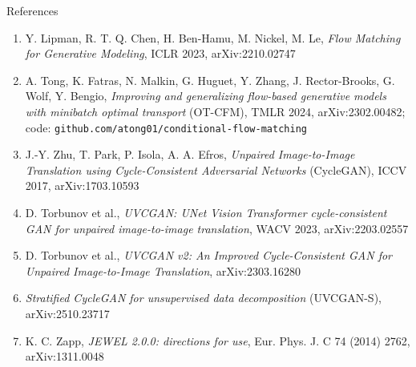 \documentclass[aspectratio=169,10pt]{beamer}
\begin{document}
\begin{frame}{References}
\footnotesize
\begin{enumerate}\setlength\itemsep{0.4em}
\item Y. Lipman, R. T. Q. Chen, H. Ben-Hamu, M. Nickel, M. Le, \emph{Flow Matching for Generative
  Modeling}, ICLR 2023, arXiv:2210.02747
\item A. Tong, K. Fatras, N. Malkin, G. Huguet, Y. Zhang, J. Rector-Brooks, G. Wolf, Y. Bengio,
  \emph{Improving and generalizing flow-based generative models with minibatch optimal transport}
  (OT-CFM), TMLR 2024, arXiv:2302.00482; code: \texttt{github.com/atong01/conditional-flow-matching}
\item J.-Y. Zhu, T. Park, P. Isola, A. A. Efros, \emph{Unpaired Image-to-Image Translation using
  Cycle-Consistent Adversarial Networks} (CycleGAN), ICCV 2017, arXiv:1703.10593
\item D. Torbunov et al., \emph{UVCGAN: UNet Vision Transformer cycle-consistent GAN for unpaired
  image-to-image translation}, WACV 2023, arXiv:2203.02557
\item D. Torbunov et al., \emph{UVCGAN v2: An Improved Cycle-Consistent GAN for Unpaired
  Image-to-Image Translation}, arXiv:2303.16280
\item \emph{Stratified CycleGAN for unsupervised data decomposition} (UVCGAN-S), arXiv:2510.23717
\item K. C. Zapp, \emph{JEWEL 2.0.0: directions for use}, Eur. Phys. J. C 74 (2014) 2762,
  arXiv:1311.0048
\end{enumerate}
\end{frame}
\end{document}
